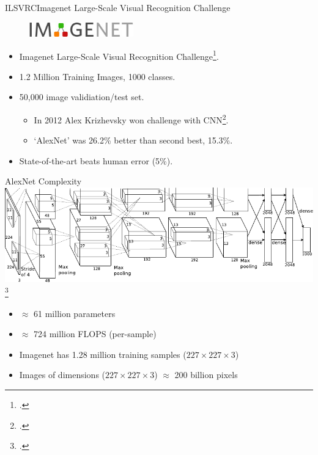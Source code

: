 \documentclass[t,xcolor=dvipsnames]{beamer}
\begin{document}
\begin{frame}{ILSVRC}{Imagenet Large-Scale Visual Recognition Challenge}

\begin{figure}
    \includegraphics[width=0.4\textwidth]{imagenetlogo}
\end{figure}
\begin{itemize}
    \item Imagenet Large-Scale Visual Recognition Challenge\footcite{ILSVRC2015}.
    \item 1.2 Million Training Images, 1000 classes.
    \item 50,000 image validiation/test set.
    \begin{itemize}
        \item In 2012 Alex Krizhevsky won challenge with CNN\footcite{Krizhevsky2012}.
        \item `AlexNet' was 26.2\% better than second best, 15.3\%.
    \end{itemize}
    \item State-of-the-art beats human error (5\%).
\end{itemize}    
\end{frame}



\begin{frame}{AlexNet Complexity}
\includegraphics[width=\columnwidth]{alexnet}\footcite{Krizhevsky2012}
\begin{itemize}
\item $\approx$ 61 million parameters %
\item $\approx$ 724 million FLOPS (per-sample) %
\item Imagenet has 1.28 million training samples ($227 \times 227 \times 3$) %
\item Images of dimensions  ($227 \times 227 \times 3$) $\approx$ 200 billion pixels %
\end{itemize}
\end{frame}
\end{document}
